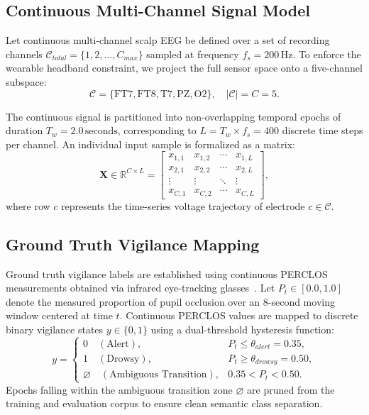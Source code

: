 \documentclass[conference]{IEEEtran}
\begin{document}
\subsection{Continuous Multi-Channel Signal Model}
Let continuous multi-channel scalp EEG be defined over a set of recording channels $\mathcal{C}_{total} = \{1, 2, \dots, C_{max}\}$ sampled at frequency $f_s = 200\,\text{Hz}$. To enforce the wearable headband constraint, we project the full sensor space onto a five-channel subspace:
\begin{equation}
    \mathcal{C} = \{\text{FT7}, \text{FT8}, \text{T7}, \text{PZ}, \text{O2}\}, \quad |\mathcal{C}| = C = 5.
\end{equation}

The continuous signal is partitioned into non-overlapping temporal epochs of duration $T_w = 2.0\,\text{seconds}$, corresponding to $L = T_w \times f_s = 400$ discrete time steps per channel. An individual input sample is formalized as a matrix:
\begin{equation}
    \mathbf{X} \in \mathbb{R}^{C \times L} = \begin{bmatrix}
        x_{1,1} & x_{1,2} & \cdots & x_{1,L} \\
        x_{2,1} & x_{2,2} & \cdots & x_{2,L} \\
        \vdots & \vdots & \ddots & \vdots \\
        x_{C,1} & x_{C,2} & \cdots & x_{C,L}
    \end{bmatrix},
\end{equation}
where row $c$ represents the time-series voltage trajectory of electrode $c \in \mathcal{C}$.

\subsection{Ground Truth Vigilance Mapping}
Ground truth vigilance labels are established using continuous PERCLOS measurements obtained via infrared eye-tracking glasses~\cite{zheng2017seedvig}. Let $P_t \in [0.0, 1.0]$ denote the measured proportion of pupil occlusion over an $8$-second moving window centered at time $t$. Continuous PERCLOS values are mapped to discrete binary vigilance states $y \in \{0, 1\}$ using a dual-threshold hysteresis function:
\begin{equation}
    y = \begin{cases}
        0 \quad (\text{Alert}), & P_t \le \theta_{alert} = 0.35, \\
        1 \quad (\text{Drowsy}), & P_t \ge \theta_{drowsy} = 0.50, \\
        \varnothing \quad (\text{Ambiguous Transition}), & 0.35 < P_t < 0.50.
    \end{cases}
    \label{eq:perclos_map}
\end{equation}
Epochs falling within the ambiguous transition zone $\varnothing$ are pruned from the training and evaluation corpus to ensure clean semantic class separation.
\end{document}
